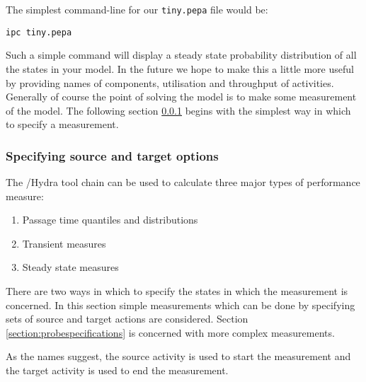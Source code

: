 The simplest command-line for our \texttt{tiny.pepa} file would be:
\begin{verbatim}
ipc tiny.pepa
\end{verbatim}

Such a simple command will display a steady state probability distribution
of all the states in your model. In the future we hope to make this a little
more useful by providing names of components, utilisation and throughput of
activities.
Generally of course the point of solving the model is to make some
measurement of the model. The following section
\ref{specsourceandtarget} begins with the simplest way in which
to specify a measurement.




\subsubsection{Specifying source and target options}
\label{specsourceandtarget}


The \ipc/Hydra tool chain can be used to calculate three major types of
performance measure:
\begin{enumerate}
\item Passage time quantiles and distributions
\item Transient measures
\item Steady state measures
\end{enumerate}

There are two ways in which to specify the states in which the
measurement is concerned. 
In this section simple measurements which can be done by specifying
sets of source and target actions are considered.
Section \ref{section:probespecifications} is concerned with more
complex measurements.

As the names suggest, the source activity is used
to start the measurement and the target activity is used to end the measurement.

